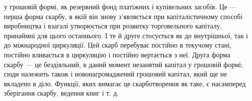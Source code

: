 \parcont{}  %
у грошовій формі, як резервний фонд платіжних і купівельних
засобів. Це — перша форма скарбу, в якій він знову з’являється
при капіталістичному способі виробництва і взагалі утворюється
при розвитку торговельного капіталу, принаймні для цього
останнього. І те й друге стосується як до внутрішньої, так і до
міжнародної циркуляції. Цей скарб перебуває постійно в текучому
стані, постійно вливається в циркуляцію і постійно вертається
з неї. Друга форма скарбу — це бездіяльний, в даний
момент незанятий капітал у грошовій формі; сюди належить
також і новонагромаджений грошовий капітал, який ще не
вкладено в діло. Функції, яких вимагає це скарботворення як
таке, є насамперед зберігання скарбу, ведення книг і т. д.

